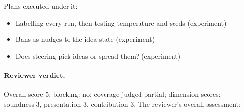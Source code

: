\documentclass[11pt,letterpaper]{article}
\begin{document}
Plans executed under it:

\begin{itemize}

\item Labelling every run, then testing temperature and seeds (experiment)

\item Bans as nudges to the idea state (experiment)

\item Does steering pick ideas or spread them? (experiment)

\end{itemize}

\paragraph{Reviewer verdict.}

Overall score 5; blocking: no; coverage judged partial; dimension scores: soundness 3, presentation 3, contribution 3. The reviewer's overall assessment:
\end{document}
